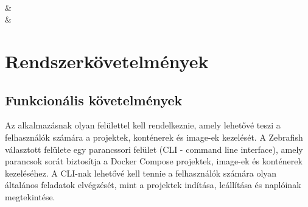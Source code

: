 \begin{requirementstable}
  \caption{Felhasználói követelmények szervízfelhasználók számára} \\

   &
   \\

   &
\end{requirementstable}

\section{Rendszerkövetelmények}

\subsection{Funkcionális követelmények}

Az alkalmazásnak olyan felülettel kell rendelkeznie, amely lehetővé teszi a felhasználók számára a projektek, konténerek és image-ek kezelését. A Zebrafish választott felülete egy parancssori felület (CLI - command line interface), amely parancsok sorát biztosítja a Docker Compose projektek, image-ek és konténerek kezeléséhez. A CLI-nak lehetővé kell tennie a felhasználók számára olyan általános feladatok elvégzését, mint a projektek indítása, leállítása és naplóinak megtekintése.

